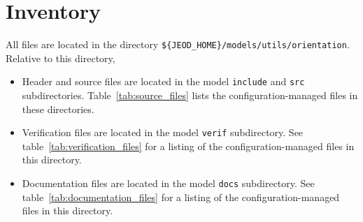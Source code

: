 \section{Inventory}
All \ModelDesc files are located in the directory
{\tt \$\{JEOD\_HOME\}/models/utils/orientation}.
Relative to this directory,
\begin{itemize}
\vspace{-0.2\baselineskip}
\item Header and source files are located
in the model {\tt include} and {\tt src} subdirectories.
Table~\ref{tab:source_files} lists the
configuration-managed files in these directories.
\vspace{-0.1\baselineskip}
\item Verification files are located in the model {\tt verif} subdirectory.
See table~\ref{tab:verification_files}
for a listing of the
configuration-managed files in this directory.
\vspace{-0.1\baselineskip}
\item Documentation files are located in the model {\tt docs} subdirectory.
See table~\ref{tab:documentation_files}
for a listing of the
configuration-managed files in this directory.
\end{itemize}


